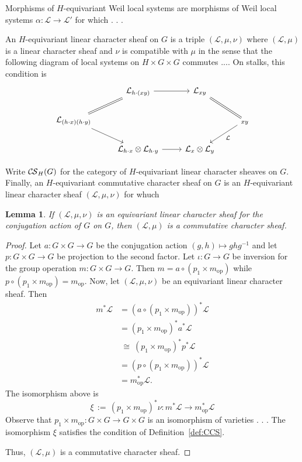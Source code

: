 \documentclass[10pt]{amsart}
\theoremstyle{plain}
\newtheorem{lemma}[theorem]{Lemma}
\theoremstyle{definition}
\newcommand{\op}{_{\operatorname{op}}}
\newcommand{\ceq}{{\, :=\, }}
\newcommand{\iso}{{\ \cong\ }}
\newcommand{\cs}[1]{{\mathcal{#1}}}
\newcommand{\CS}{{\mathcal{C\hskip-0.8pt S}}}
\begin{document}
Morphisms of $H$-equivariant Weil local systems are morphisms of Weil local systems $\alpha: \cs{L}\to \cs{L}'$ for which . . .

An $H$-equivariant linear character sheaf on $G$ is a triple $(\cs{L},\mu, \nu)$ where $(\cs{L},\mu)$ is a linear character sheaf and $\nu$ is compatible with $\mu$ in the sense that the following diagram of local systems on $H \times G\times G$ commutes ....
On stalks, this condition is
\[
\begin{tikzcd}
\ &  \cs{L}_{h\cdot (xy)} \arrow{r}{} & \cs{L}_{xy} & \\
\cs{L}_{(h\cdot x)(h\cdot y)} \arrow{dr}[swap]{} \arrow[equal]{ur} &&& \arrow[equal]{ul}  \arrow{dl}{} \cs{L}_{xy} \\
& \cs{L}_{h\cdot x}\otimes \cs{L}_{h\cdot y} \arrow{r} & \cs{L}_x\otimes \cs{L}_y & 
\end{tikzcd}
\]



Write $\CS_H(G)$ for the category of $H$-equivariant linear character sheaves on $G$.
%
Finally, an $H$-equivariant commutative character sheaf on $G$ is an $H$-equivariant linear character sheaf $(\cs{L},\mu, \nu)$ for whuch 

\begin{lemma}
If $(\cs{L},\mu,\nu)$ is an equivariant linear character sheaf for the conjugation action of $G$ on $G$, then $(\cs{L},\mu)$ is a commutative character sheaf.
\end{lemma}

\begin{proof}
Let $a : G \times G \to G$ be the conjugation action $(g,h) \mapsto ghg^{-1}$ and let $p : G \times G \to G$ be projection to the second factor.
Let $\iota : G\to G$ be inversion for the group operation $m : G\times G\to G$.
Then $m = a \circ (p_1\times m\op)$ while $p \circ (p_1\times m\op) = m\op$.
Now, let $(\cs{L}, \mu, \nu)$ be an equivariant linear character sheaf.
Then
\begin{align*}
m^* \cs{L} 
&= (a \circ (p_1 \times m\op))^* \cs{L}\\
&= (p_1 \times m\op)^* a^* \cs{L}\\
&\iso (p_1 \times m\op)^* p^* \cs{L}\\
&= (p\circ (p_1 \times m\op))^* \cs{L}\\
&= m\op^* \cs{L}.
\end{align*}
The isomorphism above is
\[
\xi \ceq (p_1 \times m\op)^* \nu : m^* \cs{L}  \to m\op^* \cs{L}
\]
Observe that $p_1 \times m\op : G\times G \to G\times G$ is an isomorphism of varieties . . . 
The isomorphism $\xi$ satisfies the condition of Definition~\ref{def:CCS}. 

Thus, $(\cs{L},\mu)$ is a commutative character sheaf.
\end{proof}
\end{document}
